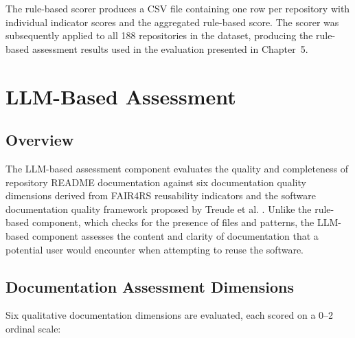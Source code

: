 The rule-based scorer produces a CSV file containing one row per 
repository with individual indicator scores and the aggregated 
rule-based score. The scorer was subsequently applied to all 188
repositories in the dataset, producing the rule-based assessment 
results used in the evaluation presented in Chapter~5.

\section{LLM-Based Assessment}

\subsection{Overview}

The LLM-based assessment component evaluates the quality and 
completeness of repository README documentation against six 
documentation quality dimensions derived from FAIR4RS reusability 
indicators \cite{barker2022fair4rs} and the software documentation 
quality framework proposed by Treude et al. \cite{treude2020beyond}. 
Unlike the rule-based component, which checks for the presence of 
files and patterns, the LLM-based component assesses the content 
and clarity of documentation that a potential user would encounter 
when attempting to reuse the software.

\subsection{Documentation Assessment Dimensions}

Six qualitative documentation dimensions are evaluated, each scored
on a 0--2 ordinal scale:


